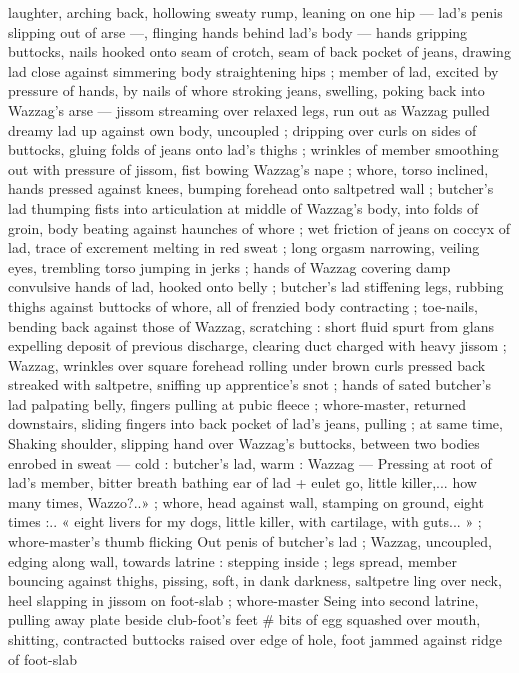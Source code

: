 laughter, arching back, hollowing sweaty rump, leaning on one hip ---
lad's penis slipping out of arse ---, flinging hands behind lad's body
--- hands gripping buttocks, nails hooked onto seam of crotch, seam
of back pocket of jeans, drawing lad close against simmering body
straightening hips ; member of lad, excited by pressure of hands, by
nails of whore stroking jeans, swelling, poking back into Wazzag's
arse --- jissom streaming over relaxed legs, run out as Wazzag pulled
dreamy lad up against own body, uncoupled ; dripping over curls on
sides of buttocks, gluing folds of jeans onto lad’s thighs ; wrinkles
of member smoothing out with pressure of jissom, fist bowing
Wazzag's nape ; whore, torso inclined, hands pressed against knees,
bumping forehead onto saltpetred wall ; butcher's lad thumping fists
into articulation at middle of Wazzag’s body, into folds of groin, body
beating against haunches of whore ; wet friction of jeans on coccyx
of lad, trace of excrement melting in red sweat ; long orgasm
narrowing, veiling eyes, trembling torso jumping in jerks ; hands of
Wazzag covering damp convulsive hands of lad, hooked onto belly ;
butcher's lad stiffening legs, rubbing thighs against buttocks of
whore, all of frenzied body contracting ; toe-nails, bending back
against those of Wazzag, scratching : short fluid spurt from glans
expelling deposit of previous discharge, clearing duct charged with
heavy jissom ; Wazzag, wrinkles over square forehead rolling under
brown curls pressed back streaked with saltpetre, sniffing up
apprentice’s snot ; hands of sated butcher's lad palpating belly,
fingers pulling at pubic fleece ; whore-master, returned downstairs,
sliding fingers into back pocket of lad’s jeans, pulling ; at same time,
Shaking shoulder, slipping hand over Wazzag's buttocks, between
two bodies enrobed in sweat --- cold : butcher's lad, warm : Wazzag
--- Pressing at root of lad's member, bitter breath bathing ear of lad
+ eulet go, little killer,... how many times, Wazzo?..» ; whore, head
against wall, stamping on ground, eight times :.. « eight livers for my
dogs, little killer, with cartilage, with guts... » ; whore-master's thumb
flicking Out penis of butcher's lad ; Wazzag, uncoupled, edging along
wall, towards latrine : stepping inside ; legs spread, member
bouncing against thighs, pissing, soft, in dank darkness, saltpetre
ling over neck, heel slapping in jissom on foot-slab ; whore-master
Seing into second latrine, pulling away plate beside club-foot's feet
# bits of egg squashed over mouth, shitting, contracted buttocks
raised over edge of hole, foot jammed against ridge of foot-slab
